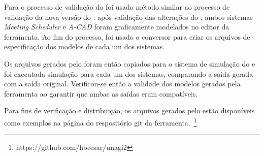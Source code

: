 Para o processo de validação do \unagi foi usado método similar ao processo de validação da nova versão do \zanshin: após validação das alterações do \framework, ambos sistemas \textit{Meeting Scheduler} e \textit{A-CAD} foram graficamente modelados no editor da ferramenta. Ao fim do processo, foi usado o conversor para criar os arquivos \xml de especificação dos modelos de cada um dos sistemas. 

Os arquivos gerados pelo \unagi foram então copiados para o sistema de simulação do \zanshin e foi executada simulação para cada um dos sistemas, comparando a saída gerada com a saída original. Verificou-se então a validade dos modelos gerados pela ferramenta ao garantir que ambas as saídas eram compatíveis.

Para fins de verificação e distribuição, os arquivos gerados pelo \unagi estão disponíveis como exemplos na página do respositório git da ferramenta.~\footnote{https://github.com/hbcesar/unagi2}